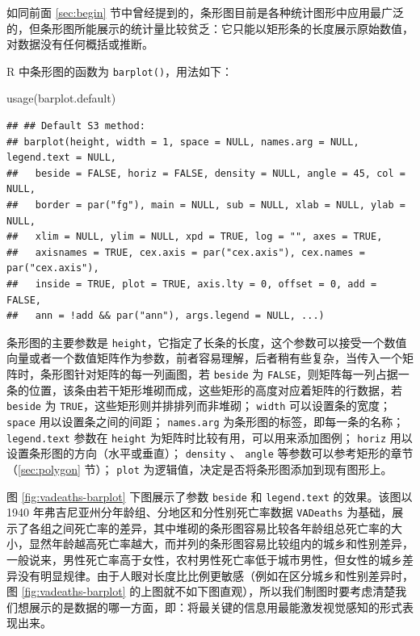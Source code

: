 \documentclass[
  b5paper,
  UTF8,twoside]{book}
\newenvironment{Shaded}{\begin{snugshade}}{\end{snugshade}}
\newcommand{\FunctionTok}[1]{\textcolor[rgb]{0.00,0.00,0.00}{#1}}
\newcommand{\NormalTok}[1]{#1}
\begin{document}
如同前面 \ref{sec:begin} 节中曾经提到的，条形图目前是各种统计图形中应用最广泛的，但条形图所能展示的统计量比较贫乏：它只能以矩形条的长度展示原始数值，对数据没有任何概括或推断。

R 中条形图的函数为 \texttt{barplot()}，用法如下：

\begin{Shaded}
\begin{Highlighting}[]
\FunctionTok{usage}\NormalTok{(barplot.default)}
\end{Highlighting}
\end{Shaded}

\begin{verbatim}
## ## Default S3 method:
## barplot(height, width = 1, space = NULL, names.arg = NULL, legend.text = NULL,
##   beside = FALSE, horiz = FALSE, density = NULL, angle = 45, col = NULL,
##   border = par("fg"), main = NULL, sub = NULL, xlab = NULL, ylab = NULL,
##   xlim = NULL, ylim = NULL, xpd = TRUE, log = "", axes = TRUE,
##   axisnames = TRUE, cex.axis = par("cex.axis"), cex.names = par("cex.axis"),
##   inside = TRUE, plot = TRUE, axis.lty = 0, offset = 0, add = FALSE,
##   ann = !add && par("ann"), args.legend = NULL, ...)
\end{verbatim}

条形图的主要参数是 \texttt{height}，它指定了长条的长度，这个参数可以接受一个数值向量或者一个数值矩阵作为参数，前者容易理解，后者稍有些复杂，当传入一个矩阵时，条形图针对矩阵的每一列画图，若 \texttt{beside} 为 \texttt{FALSE}，则矩阵每一列占据一条的位置，该条由若干矩形堆砌而成，这些矩形的高度对应着矩阵的行数据，若 \texttt{beside} 为 \texttt{TRUE}，这些矩形则并排排列而非堆砌； \texttt{width} 可以设置条的宽度； \texttt{space} 用以设置条之间的间距； \texttt{names.arg} 为条形图的标签，即每一条的名称； \texttt{legend.text} 参数在 \texttt{height} 为矩阵时比较有用，可以用来添加图例； \texttt{horiz} 用以设置条形图的方向（水平或垂直）； \texttt{density} 、 \texttt{angle} 等参数可以参考矩形的章节（\ref{sec:polygon} 节）； \texttt{plot} 为逻辑值，决定是否将条形图添加到现有图形上。

图 \ref{fig:vadeaths-barplot}
下图展示了参数 \texttt{beside} 和 \texttt{legend.text} 的效果。该图以 1940 年弗吉尼亚州分年龄组、分地区和分性别死亡率数据 \texttt{VADeaths} 为基础，展示了各组之间死亡率的差异，其中堆砌的条形图容易比较各年龄组总死亡率的大小，显然年龄越高死亡率越大，而并列的条形图容易比较组内的城乡和性别差异，一般说来，男性死亡率高于女性，农村男性死亡率低于城市男性，但女性的城乡差异没有明显规律。由于人眼对长度比比例更敏感（例如在区分城乡和性别差异时，图 \ref{fig:vadeaths-barplot}
的上图就不如下图直观），所以我们制图时要考虑清楚我们想展示的是数据的哪一方面，即：将最关键的信息用最能激发视觉感知的形式表现出来。
\end{document}
